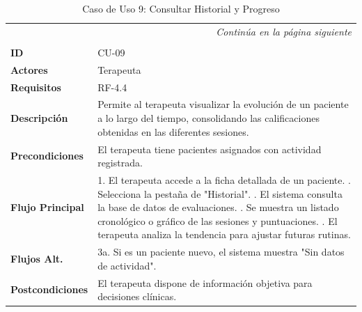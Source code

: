 \clearpage
\begin{longtable}{p{} p{}}
    \toprule
    \endfirsthead
    \toprule
    \endhead
    \midrule
    \multicolumn{2}{r}{\small\itshape Continúa en la página siguiente} \\
    \endfoot
    \bottomrule
    \noalign{\vspace{0.5cm}}
    \caption{Caso de Uso 9: Consultar Historial y Progreso} \label{cu:9} \\
    \endlastfoot

    \textbf{ID} & CU-09 \\ \midrule
    \textbf{Actores} & Terapeuta \\ \midrule
    \textbf{Requisitos} & RF-4.4 \\ \midrule
    \textbf{Descripción} & Permite al terapeuta visualizar la evolución de un paciente a lo largo del tiempo, consolidando las calificaciones obtenidas en las diferentes sesiones. \\ \midrule
    \textbf{Precondiciones} & El terapeuta tiene pacientes asignados con actividad registrada. \\ \midrule
    \textbf{Flujo Principal} & 
    1. El terapeuta accede a la ficha detallada de un paciente. \newline
    2. Selecciona la pestaña de "Historial". \newline
    3. El sistema consulta la base de datos de evaluaciones. \newline
    4. Se muestra un listado cronológico o gráfico de las sesiones y puntuaciones. \newline
    5. El terapeuta analiza la tendencia para ajustar futuras rutinas. \\ \midrule
    \textbf{Flujos Alt.} & 
    3a. Si es un paciente nuevo, el sistema muestra "Sin datos de actividad". \\ \midrule
    \textbf{Postcondiciones} & El terapeuta dispone de información objetiva para decisiones clínicas. \\
\end{longtable}


